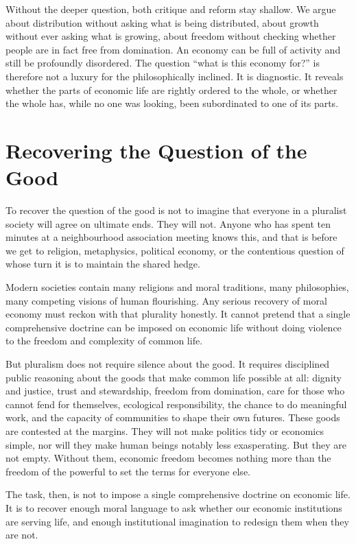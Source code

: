 \documentclass[11pt,a4paper,oneside]{book}
\begin{document}
Without the deeper question, both critique and reform stay shallow. We argue about distribution without asking what is being distributed, about growth without ever asking what is growing, about freedom without checking whether people are in fact free from domination. An economy can be full of activity and still be profoundly disordered. The question ``what is this economy for?'' is therefore not a luxury for the philosophically inclined. It is diagnostic. It reveals whether the parts of economic life are rightly ordered to the whole, or whether the whole has, while no one was looking, been subordinated to one of its parts.

\section*{Recovering the Question of the Good}

To recover the question of the good is not to imagine that everyone in a pluralist society will agree on ultimate ends. They will not. Anyone who has spent ten minutes at a neighbourhood association meeting knows this, and that is before we get to religion, metaphysics, political economy, or the contentious question of whose turn it is to maintain the shared hedge.

Modern societies contain many religions and moral traditions, many philosophies, many competing visions of human flourishing. Any serious recovery of moral economy must reckon with that plurality honestly. It cannot pretend that a single comprehensive doctrine can be imposed on economic life without doing violence to the freedom and complexity of common life.

But pluralism does not require silence about the good. It requires disciplined public reasoning about the goods that make common life possible at all: dignity and justice, trust and stewardship, freedom from domination, care for those who cannot fend for themselves, ecological responsibility, the chance to do meaningful work, and the capacity of communities to shape their own futures. These goods are contested at the margins. They will not make politics tidy or economics simple, nor will they make human beings notably less exasperating. But they are not empty. Without them, economic freedom becomes nothing more than the freedom of the powerful to set the terms for everyone else.

The task, then, is not to impose a single comprehensive doctrine on economic life. It is to recover enough moral language to ask whether our economic institutions are serving life, and enough institutional imagination to redesign them when they are not.
\end{document}
